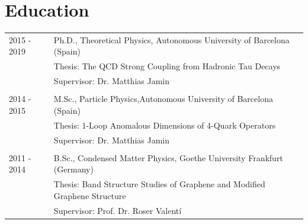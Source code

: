 \documentclass[11pt]{article}
\begin{document}
\begin{tabularx}{\textwidth}{lX}
  
  
  
\end{tabularx}


\section*{Education}
\begin{tabularx}{\textwidth}{sX}
  2015 - 2019  & Ph.D., Theoretical Physics, Autonomous University of
                 Barcelona (Spain) \\
               & Thesis: The QCD Strong Coupling from Hadronic Tau
                 Decays \\
               & Supervisor: Dr. Matthias Jamin \\\\
  2014 - 2015  & M.Sc., Particle Physics,Autonomous University of
                                Barcelona (Spain) \\
               & Thesis: 1-Loop Anomalous Dimensions of 4-Quark
                 Operators \\
               & Supervisor: Dr. Matthias Jamin \\\\
  2011 - 2014  & B.Sc., Condensed Matter Physics, Goethe University Frankfurt (Germany) \\
               & Thesis: Band Structure Studies of Graphene and Modified
                 Graphene Structure \\
               & Supervisor: Prof. Dr. Roser Valentí
\end{tabularx}
		
\end{document}
